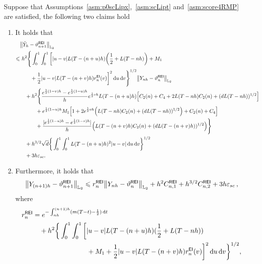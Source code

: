 \begin{proposition}
    \label{prop:RMPEI}
    Suppose that Assumptions~\ref{asm:p0scLipx},~\ref{asm:scLipt} and~\ref{asm:score4RMP} are satisfied, the following two claims hold
    \begin{enumerate}[label=\textbf{(\arabic*)}, leftmargin=2em]
        \item \label{item:REItilde} It holds that
        \begin{align*}
            &\l|\tilde{Y}_h-\vartheta_{n+1}^{\sf REI}\r|_{\Ltwo}\\
            \leqslant&\,\,h^2\Bigg\{\int_0^1\int_0^1\bigg[|u-v|L(T-(n+u)h)\left(\dfrac{1}{2}+L(T-nh)\right)+M_1\\
            &\qquad+\dfrac{1}{2}|u-v|L(T-(n+v)h)r_n^{\sf EI}(v)\bigg]^2\rmd u\rmd v\Bigg\}^{1/2}\l|Y_{nh}-\vartheta_n^{\sf REI}\r|_{\Ltwo}\\
            &\quad +h^2\Bigg\{\dfrac{e^{\frac{1}{2}(1-v)h}-e^{\frac{1}{2}(1-u)h}}{h}e^{\frac{1}{2}vh}L(T-(n+u)h)\left[C_2(n)+C_4+2L(T-nh)C_2(n)+(dL(T-nh))^{1/2}\right]\\
            &\qquad\quad +e^{\frac{1}{2}(1-u)h}M_1\left[1+2e^{\frac{1}{2}vh}\left(L(T-nh)C_2(n)+(dL(T-nh))^{1/2}\right)+C_2(n)+C_4\right]\\
            &\qquad\quad +\dfrac{|e^{\frac{1}{2}(1-u)h}-e^{\frac{1}{2}(1-v)h}|}{h}\left(L(T-(n+v)h)C_2(n)+(dL(T-(n+v)h))^{1/2}\right)\Bigg\}\\
            &\quad +h^{3/2}\sqrt{d}\bigg\{\int_0^1\int_0^1L(T-(n+u)h)^2|u-v|\rmd u\rmd v\bigg\}^{1/2}\\
            &\quad +3h\varepsilon_{sc}.
        \end{align*}
        \item \label{item:REIYt}
        Furthermore, it holds that
        \begin{align*}
            \l|Y_{(n+1)h}-\vartheta_{n+1}^{\sf REI}\r|_{\Ltwo}\leqslant r_n^{\sf REI}\l|Y_{nh}-\vartheta_n^{\sf REI}\r|_{\Ltwo}+h^2C_{n,1}^{\sf REI}+h^{3/2}C_{n,2}^{\sf REI}+3h\varepsilon_{sc}\,,
        \end{align*}
        where
        \begin{align*}
            r_n^{\sf REI}&=e^{-\int_{nh}^{(n+1)h}(m(T-t)-\frac{1}{2})\rmd t}\\
            &\quad +h^2\bigg\{\int_0^1\int_0^1\bigg[|u-v|L(T-(n+u)h)(\dfrac{1}{2}+L(T-nh))\\
            &\qquad\qquad\qquad\qquad+M_1+\dfrac{1}{2}|u-v|L(T-(n+v)h)r_n^{\sf EI}(v)\bigg]^2\rmd u\rmd v\bigg\}^{1/2},\\

\end{align*}
\end{enumerate}
\end{proposition}

